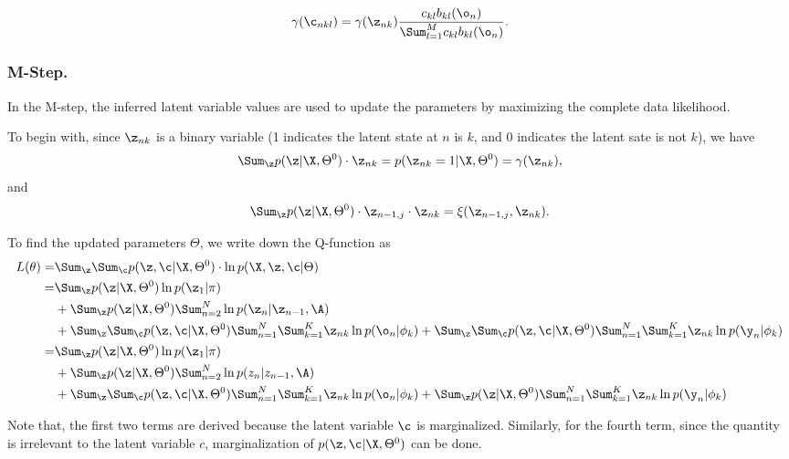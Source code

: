 $$
\gamma(\c_{nkl}) = \gamma(\z_{nk}) \frac{c_{kl} b_{kl}(\o_n)}{\Sum_{l=1}^M c_{kl} b_{kl}(\o_n)}.
$$

\subsubsection{M-Step.}

In the M-step, the inferred latent variable values are used to update the parameters
by maximizing the complete data likelihood.

To begin with, since $\z_{nk}$ is a binary variable (1 indicates the latent state at $n$ is $k$, and 0 indicates
the latent sate is not $k$), we have
$$
\Sum_{\z} p(\z | \X, \Theta^0) \cdot \z_{nk} = p(\z_{nk} = 1 | \X, \Theta^0) = \gamma(\z_{nk}),
$$
and
$$
\Sum_{\z} p(\z | \X, \Theta^0) \cdot \z_{n-1, j} \cdot \z_{nk} = \xi(\z_{n-1, j}, \z_{nk}).
$$


To find the updated parameters $\Theta$, we write down the Q-function as
\begin{align*}
  L(\theta)
  = & \Sum_{\z} \Sum_{\c} p(\z, \c| \X, \Theta^0) \cdot \ln p(\X, \z, \c| \Theta) \\
  = & \Sum_{\z} p(\z | \X, \Theta^0) \ln p(\z_1 | \pi) \\
  & +  \Sum_{\z} p(\z | \X, \Theta^0) \Sum_{n=2}^N \ln p(\z_n | \z_{n-1}, \A) \\
  & +  \Sum_{\z} \Sum_{\c} p(\z, \c| \X, \Theta^0) \Sum_{n=1}^N \Sum_{k=1}^K \z_{nk} \ln p(\o_n | \phi_k)
  +  \Sum_{\z} \Sum_{\c} p(\z, \c| \X, \Theta^0) \Sum_{n=1}^N \Sum_{k=1}^K \z_{nk} \ln p(\y_n | \phi_k) \\
  = & \Sum_{\z} p(\z | \X, \Theta^0) \ln p(\z_1 | \pi) \\
  & +  \Sum_{\z} p(\z | \X, \Theta^0) \Sum_{n=2}^N \ln p(z_n | z_{n-1}, \A) \\
  & +  \Sum_{\z} \Sum_{\c} p(\z, \c| \X, \Theta^0) \Sum_{n=1}^N \Sum_{k=1}^K \z_{nk} \ln p(\o_n | \phi_k)
  +  \Sum_{\z} p(\z| \X, \Theta^0) \Sum_{n=1}^N \Sum_{k=1}^K \z_{nk} \ln p(\y_n | \phi_k) \\
\end{align*}

Note that, the first two terms are derived because the latent variable $\c$ is
marginalized. Similarly, for the fourth term, since the quantity is irrelevant to the latent 
variable $c$, marginalization of $p(\z, \c| \X, \Theta^0)$ can be done.


